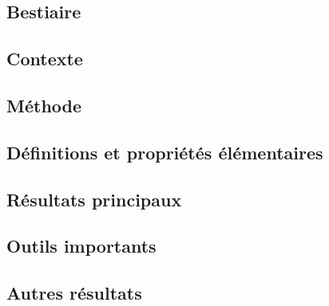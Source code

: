 \documentclass[11pt,a4paper]{article}
\begin{document}
\newpage
\begin{center}  
\section*{Bestiaire} 
\end{center}




\subsection*{Contexte}

\subsection*{Méthode}

\subsection*{Définitions et propriétés élémentaires}

\subsection*{Résultats principaux}

\subsection*{Outils importants}


\subsection*{Autres résultats}
\end{document}
